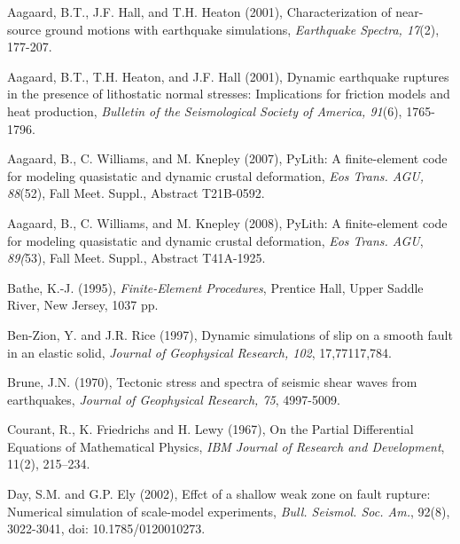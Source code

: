 \begin{thebibliography}{Bibliography}
  
Aagaard, B.T.,
  J.F. Hall, and T.H. Heaton (2001), Characterization of near-source
  ground motions with earthquake simulations, \emph{Earthquake
    Spectra, 17}(2), 177-207.

Aagaard, B.T.,
  T.H. Heaton, and J.F. Hall (2001), Dynamic earthquake ruptures in
  the presence of lithostatic normal stresses: Implications for
  friction models and heat production, \emph{Bulletin of the
    Seismological Society of America, 91}(6), 1765-1796.

Aagaard, B., C.
  Williams, and M. Knepley (2007), PyLith: A finite-element code for
  modeling quasistatic and dynamic crustal deformation, \emph{Eos
    Trans.  AGU, 88}(52), Fall Meet. Suppl., Abstract T21B-0592.

Aagaard, B., C.
  Williams, and M. Knepley (2008), PyLith: A finite-element code for
  modeling quasistatic and dynamic crustal deformation, \emph{Eos
    Trans.  AGU}, \emph{89(}53), Fall Meet. Suppl., Abstract
  T41A-1925.

Bathe, K.-J. (1995),
  \textit{Finite-Element Procedures}, Prentice Hall, Upper Saddle
  River, New Jersey, 1037 pp.

Ben-Zion, Y.  and
  J.R. Rice (1997), Dynamic simulations of slip on a smooth fault in
  an elastic solid, \emph{Journal of Geophysical Research}\textit{,
    102}, 17,771\textendash{}17,784.

Brune, J.N. (1970), Tectonic stress
  and spectra of seismic shear waves from earthquakes, \emph{Journal
    of Geophysical Research, 75}, 4997-5009.

Courant, R., K.
  Friedrichs and H. Lewy (1967), On the Partial Differential Equations
  of Mathematical Physics, \textit{IBM Journal of Research and
    Development}, 11(2), 215--234.

Day, S.M. and G.P. Ely
  (2002), Effct of a shallow weak zone on fault rupture: Numerical
  simulation of scale-model experiments,
  \textit{Bull. Seismol. Soc. Am.}, 92(8), 3022-3041, doi:
  10.1785/0120010273.


\end{thebibliography}
